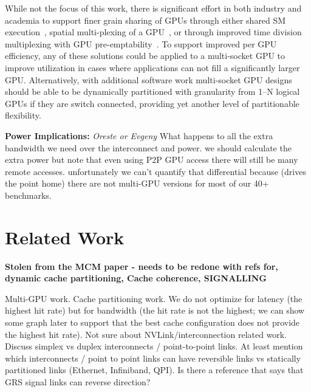 While not the focus of this work,
there is significant effort in both industry and academia to support finer
grain sharing of GPUs through either shared SM execution~\cite{XXX}, spatial
multi-plexing of a GPU~\cite{XXX}, or through improved time division multiplexing
with GPU pre-emptability~\cite{XXX}.  To support improved per GPU efficiency,
any of these solutions could be applied to a multi-socket GPU to improve utilization
in cases where applications can not fill a significantly larger GPU.  Alternatively,
with additional software work multi-socket GPU designs should be able to be dynamically
partitioned with granularity from 1--N logical GPUs if they are switch connected, providing
yet another level of partitionable flexibility.

\textbf{Power Implications:} \textit{Oreste or Evgeny}
What happens to all the extra bandwidth we need over the interconnect and
power.  we should calculate the extra power but note that even using P2P GPU
access there will still be many remote accesses.  unfortunately we can't quantify
that differential because (drives the point home) there are not multi-GPU versions
for most of our 40+ benchmarks.

\section{Related Work}

\textbf{Stolen from the MCM paper - needs to be redone with refs for, dynamic
cache partitioning, Cache coherence, SIGNALLING}

Multi-GPU work.
Cache partitioning work.
We do not optimize for latency (the highest hit rate) but for 
bandwidth (the hit rate is not the highest; we can show some graph later 
to support that the best cache configuration does not provide the highest hit 
rate).
Not sure about NVLink/interconnection related work.
Discuss simplex vs duplex interconnects / point-to-point links.
At least mention which interconnects / point to point links can have 
reversible links vs statically partitioned links (Ethernet, Infiniband, QPI).
Is there a reference that says that GRS signal links can reverse direction?

